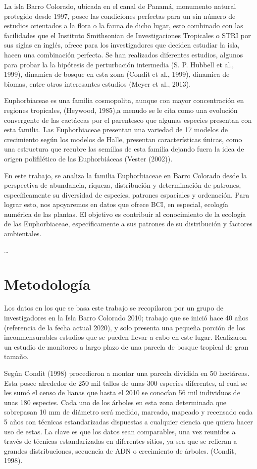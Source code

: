 \documentclass[11pt,]{article}
\begin{document}
La isla Barro Colorado, ubicada en el canal de Panamá, monumento natural
protegido desde 1997, posee las condiciones perfectas para un sin número
de estudios orientados a la flora o la fauna de dicho lugar, esto
combinado con las facilidades que el Instituto Smithsonian de
Investigaciones Tropicales o STRI por sus siglas en inglés, ofrece para
los investigadores que deciden estudiar la isla, hacen una combinación
perfecta. Se han realizados diferentes estudios, algunos para probar la
la hipótesis de perturbación intermedia (S. P. Hubbell et al., 1999),
dinamica de bosque en esta zona (Condit et al., 1999), dinamica de
biomas, entre otros interesantes estudios (Meyer et al., 2013).

Euphorbiaceae es una familia cosmopolita, aunque con mayor concentración
en regiones tropicales, (Heywood, 1985),a menudo se le cita como una
evolución convergente de las cactáceas por el parentesco que algunas
especies presentan con esta familia. Las Euphorbiaceae presentan una
variedad de 17 modelos de crecimiento según los modelos de Halle,
presentan características únicas, como una estructura que recubre las
semillas de esta familia dejando fuera la idea de origen polifilético de
las Euphorbiáceas (Vester (2002)).

En este trabajo, se analiza la familia Euphorbiaceae en Barro Colorado
desde la perspectiva de abundancia, riqueza, distribución y
determinación de patrones, específicamente su diversidad de especies,
patrones espaciales y ordenación. Para lograr esto, nos apoyaremos en
datos que ofrece BCI, en especial, ecología numérica de las plantas. El
objetivo es contribuir al conocimiento de la ecología de las
Euphorbiaceae, específicamente a sus patrones de su distribución y
factores ambientales.

\ldots

\section{Metodología}\label{metodologuxeda}

Los datos en los que se basa este trabajo se recopilaron por un grupo de
investigadores en la Isla Barro Colorado 2010; trabajo que se inició
hace 40 años (referencia de la fecha actual 2020), y solo presenta una
pequeña porción de los inconmensurables estudios que se pueden llevar a
cabo en este lugar. Realizaron un estudio de monitoreo a largo plazo de
una parcela de bosque tropical de gran tamaño.

Según Condit (1998) procedieron a montar una parcela dividida en 50
hectáreas. Esta posee alrededor de 250 mil tallos de unas 300 especies
diferentes, al cual se les sumó el censo de lianas que hasta el 2010 se
conocían 56 mil individuos de unas 180 especies. Cada uno de los árboles
en esta zona determinada que sobrepasan 10 mm de diámetro será medido,
marcado, mapeado y recensado cada 5 años con técnicas estandarizadas
dispuestas a cualquier ciencia que quiera hacer uso de estas. La clave
es que los datos sean comparables, una vez reunidos a través de técnicas
estandarizadas en diferentes sitios, ya sea que se refieran a grandes
distribuciones, secuencia de ADN o crecimiento de árboles. (Condit,
1998).
\end{document}
